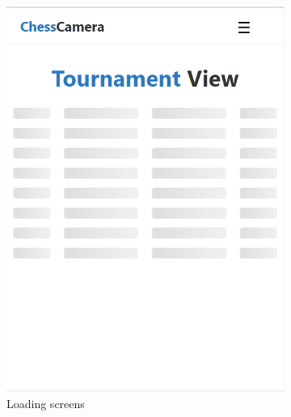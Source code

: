 \begin{figure}[h!]
    \centering
    \begin{subfigure}[h!]{0.4\linewidth}
        \centering
        \includegraphics[width=\linewidth]{figures/results/frontend/tournament-view/loading-mobile.png}
        \caption{Loading screens}
        \label{fig:small-tournament-view-loading}
    \end{subfigure}
    \hfill
    \begin{subfigure}[h!]{0.4\linewidth}
        \centering

\end{subfigure}
\end{figure}
